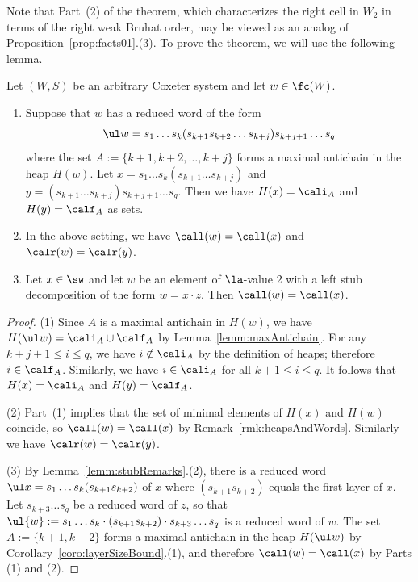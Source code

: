\noindent
Note that Part~(2) of the theorem, which characterizes the right cell in $W_2$ in terms of the right
weak Bruhat order, may be viewed as an analog of Proposition~\ref{prop:facts01}.(3). To prove the theorem, we
will use the following lemma. 

\begin{lemma}
    \label{lemm:decompAndDescent}
    Let $(W,S)$ be an arbitrary Coxeter system and let $w\in \fc(W)$.
    \begin{enumerate}
        \item Suppose that $w$ has a reduced word of the form 
            \[
                \ul w=s_1\dots s_k (s_{k+1}s_{k+2}\dots s_{k+j})s_{k+j+1}\dots s_{q}
         \]
         where the set $A:=\{k+1,k+2,\dots,k+j\}$ forms a maximal antichain in
             the heap $H(w)$. Let $x=s_1\dots s_k(s_{k+1}\dots s_{k+j})$ and $y=(s_{k+1}\dots s_{k+j})s_{k+j+1}\dots s_q$.
             Then we have $H(x)=\cali_A$ and $H(y)=\calf_A$ as sets. 
            
        \item In the above setting, we have $\call(w)=\call(x)$ and $\calr(w)=\calr(y)$.  

        \item Let $x\in \sw$ and let $w$ be an element of $\la$-value 2 with a
    left stub decomposition of the form $w=x\cdot z$. Then $\call(w)=\call(x)$.
    \end{enumerate}
\end{lemma}
\begin{proof}
    (1) Since $A$ is a maximal antichain in $H(w)$, we have $H(\ul w)=\cali_{A}\cup\calf_{A}$ by
    Lemma~\ref{lemm:maxAntichain}. For any $k+j+1\le i\le q$, we have $i\notin\cali_A$ by the definition
    of heaps; therefore $i\in \calf_A$. Similarly, we have $i\in \cali_A$ for all $k+1\le i\le q$.
    It follows that $H(x)=\cali_A$ and $H(y)=\calf_A$.

    (2) Part~(1) implies that the set of minimal elements of $H(x)$ and $H(w)$ coincide, so
    $\call(w)= \call(x)$ by Remark~\ref{rmk:heapsAndWords}. Similarly we have $\calr(w)=\calr(y)$.

    (3) By Lemma~\ref{lemm:stubRemarks}.(2), there is a reduced word $\ul x=s_1\dots
    s_{k}(s_{k+1}s_{k+2})$ of $x$ where $(s_{k+1}s_{k+2})$ equals the first layer of $x$. Let
    $s_{k+3}\dots s_{q}$ be a reduced word of $z$, so that $\ul{w}:=s_1\dots s_k\cdot
    (s_{k+1}s_{k+2})\cdot s_{k+3}\dots s_{q}$ is a reduced word of $w$.  The set $A:=\{k+1,k+2\}$
    forms a maximal antichain in the heap $H(\ul w)$ by Corollary~\ref{coro:layerSizeBound}.(1), and
    therefore $\call(w)=\call(x)$ by Parts (1) and (2).
\end{proof}
